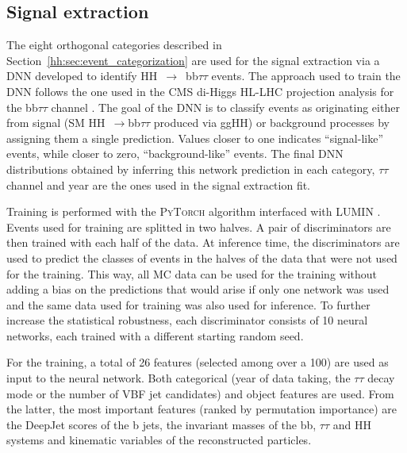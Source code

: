 \documentclass[../main.tex]{subfiles}
\begin{document}
\subsection{Signal extraction}
\label{hh:subs:signal_extraction}

The eight orthogonal categories described in Section~\ref{hh:sec:event_categorization} are used for the signal extraction via a DNN developed to identify HH~$\to$~bb$\tau\tau$ events. The approach used to train the DNN \cite{hh:analysis:gilesdnn} follows the one used in the CMS di-Higgs HL-LHC projection analysis for the bb$\tau\tau$ channel \cite{hh:analysis:hh_hllhc}. The goal of the DNN is to classify events as originating either from signal (SM HH~$\to$bb$\tau\tau$ produced via ggHH) or background processes by assigning them a single prediction. Values closer to one indicates ``signal-like'' events, while  closer to zero, ``background-like'' events. The final DNN distributions obtained by inferring this network prediction in each category, $\tau\tau$ channel and year are the ones used in the signal extraction fit.

Training is performed with the \textsc{PyTorch} \cite{hh:analysis:pytorch} algorithm interfaced with \textsc{LUMIN} \cite{hh:analysis:lumin}. Events used for training are splitted in two halves. A pair of discriminators are then trained with each half of the data. At inference time, the discriminators are used to predict the classes of events in the halves of the data that were not used for the training. This way, all MC data can be used for the training without adding a bias on the predictions that would arise if only one network was used and the same data used for training was also used for inference. To further increase the statistical robustness, each discriminator consists of 10 neural networks, each trained with a different starting random seed.

For the training, a total of 26 features (selected among over a 100) are used as input to the neural network. Both categorical (year of data taking, the $\tau\tau$ decay mode or the number of VBF jet candidates) and object features are used. From the latter, the most important features (ranked by permutation importance) are the DeepJet scores of the b jets, the invariant masses of the bb, $\tau\tau$ and HH systems and kinematic variables of the reconstructed particles.



\end{document}
